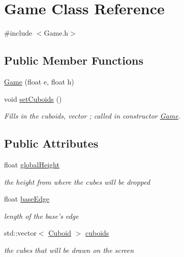 \hypertarget{classGame}{\section{\-Game \-Class \-Reference}
\label{classGame}
}


{\ttfamily \#include $<$\-Game.\-h$>$}

\subsection*{\-Public \-Member \-Functions}
\begin{DoxyCompactItemize}
\item 
\hyperlink{classGame_aa95d99967418382df208c91df340f14c}{\-Game} (float e, float h)
\item 
void \hyperlink{classGame_af567e0164aeb9e73676c0a02f6bcd04f}{set\-Cuboids} ()
\begin{DoxyCompactList}\small\item\em \-Fills in the cuboids, vector ; called in constructor \hyperlink{classGame}{\-Game}. \end{DoxyCompactList}\end{DoxyCompactItemize}
\subsection*{\-Public \-Attributes}
\begin{DoxyCompactItemize}
\item 
float \hyperlink{classGame_a61a6a4650669829ee22f39cc54d141b5}{global\-Height}
\begin{DoxyCompactList}\small\item\em the height from where the cubes will be dropped \end{DoxyCompactList}\item 
float \hyperlink{classGame_a3ef8b611b0219f78002fcf097c0a3cc4}{base\-Edge}
\begin{DoxyCompactList}\small\item\em length of the base's edge \end{DoxyCompactList}\item 
std\-::vector$<$ \hyperlink{classCuboid}{\-Cuboid} $>$ \hyperlink{classGame_a347ab3552211e8b9d1f6d6a57aa4f422}{cuboids}
\begin{DoxyCompactList}\small\item\em the cubes that will be drawn on the screen \end{DoxyCompactList}\end{DoxyCompactItemize}


